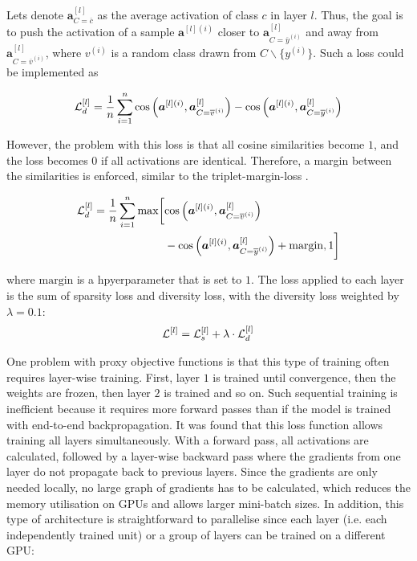 Lets denote {\footnotesize $\boldsymbol{a}^{[l]}_{C=\overline{c}}$} as the average activation of class $c$ in layer $l$. Thus, the goal is to push the activation of a sample {\footnotesize $\boldsymbol{a}^{[l](i)}$} closer to {\footnotesize $\boldsymbol{a}^{[l]}_{C=\overline{y}^{(i)}}$} and away from {\footnotesize $\boldsymbol{a}^{[l]}_{C=\overline{v}^{(i)}}$}, where $v^{(i)}$ is a random class drawn from {\footnotesize $ C \backslash \{y^{(i)} \}$}. Such a loss could be implemented as

\begin{align}\eqlbl{vso_8}
		\mathcal{L}^{[l]}_{d}  = \frac{1}{n} \sum_{i=1}^{n} \text{cos} \left(\boldsymbol{a}^{[l](i)}, \boldsymbol{a}^{[l]}_{C=\overline{v}^{(i)}} \right) - \text{cos} \left(\boldsymbol{a}^{[l](i)}, \boldsymbol{a}^{[l]}_{C=\overline{y}^{(i)}} \right)
\end{align}

However, the problem with this loss is that all cosine similarities become $1$, and the loss becomes $0$ if all activations are identical.
Therefore, a margin between the similarities is enforced, similar to the triplet-margin-loss  .


\begin{align}\eqlbl{vso_9}
\begin{split}
		\mathcal{L}^{[l]}_{d} = \frac{1}{n} \sum_{i=1}^{n} \max \biggl[ & \text{cos} \left(\boldsymbol{a}^{[l](i)}, \boldsymbol{a}^{[l]}_{C=\overline{v}^{(i)}} \right) \\
		& - \text{cos} \left(\boldsymbol{a}^{[l](i)}, \boldsymbol{a}^{[l]}_{C=\overline{y}^{(i)}} \right) + \text{margin}, 1 \biggr]
\end{split}
\end{align}

where $\text{margin}$ is a hpyerparameter that is set to $1$.
The loss applied to each layer is the sum of sparsity loss and diversity loss, with the diversity loss weighted by $\lambda=0.1$:
\begin{align}\eqlbl{vso_10}
		\mathcal{L}^{[l]} =\mathcal{L}^{[l]}_{s} + \lambda \cdot \mathcal{L}^{[l]}_{d}
\end{align}


One problem with proxy objective functions is that this type of training often requires layer-wise training. First, layer $1$ is trained until convergence, then the weights are frozen, then layer $2$ is trained and so on.
Such sequential training is inefficient because it requires more forward passes than if the model is trained with end-to-end backpropagation.
It was found that this loss function allows training all layers simultaneously. With a forward pass, all activations are calculated, followed by a layer-wise backward pass where the gradients from one layer do not propagate back to previous layers.
Since the gradients are only needed locally, no large graph of gradients has to be calculated, which reduces the memory utilisation on GPUs and allows larger mini-batch sizes. In addition, this type of architecture is straightforward to parallelise since each layer (i.e. each independently trained unit) or a group of layers can be trained on a different GPU:

